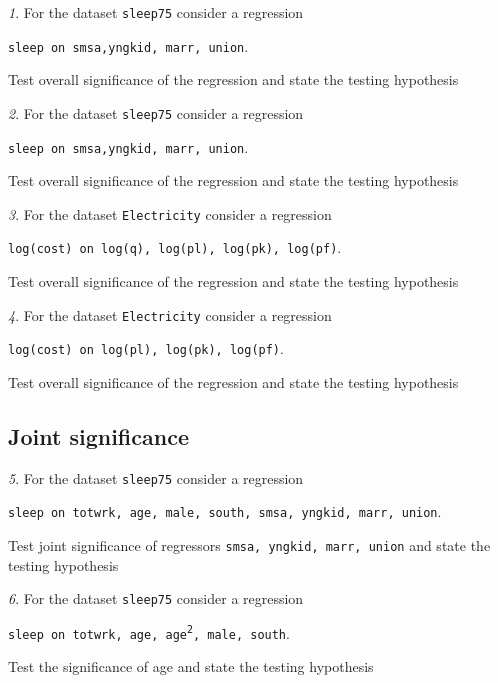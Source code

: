 \documentclass[12pt]{article}
\theoremstyle{remark}
\newtheorem{problem}{}[section]
\begin{document}
\begin{problem}
For the dataset \texttt{sleep75} consider a regression
\begin{center}
	\texttt{sleep on smsa,yngkid, marr, union}.
\end{center}
Test overall significance of the regression and state the testing hypothesis
\end{problem}

\begin{problem}
For the dataset \texttt{sleep75} consider a regression
\begin{center}
	\texttt{sleep on smsa,yngkid, marr, union}.
\end{center}
Test overall significance of the regression and state the testing hypothesis
\end{problem}

\begin{problem}
For the dataset \texttt{Electricity} consider a regression
\begin{center}
	\texttt{log(cost) on log(q), log(pl), log(pk), log(pf)}.
\end{center}
Test overall significance of the regression and state the testing hypothesis
\end{problem}

\begin{problem}
For the dataset \texttt{Electricity} consider a regression
\begin{center}
	\texttt{log(cost) on log(pl), log(pk), log(pf)}.
\end{center}
Test overall significance of the regression and state the testing hypothesis
\end{problem}

\subsection{Joint significance}

\begin{problem}
For the dataset \texttt{sleep75} consider a regression
\begin{center}
	\texttt{sleep on totwrk, age, male, south, smsa, yngkid, marr, union}.
\end{center}
Test joint significance of regressors \texttt{smsa, yngkid, marr, union} and 
state the testing hypothesis
\end{problem}

\begin{problem}
For the dataset \texttt{sleep75} consider a regression
\begin{center}
	\texttt{sleep on totwrk, age, age\textsuperscript{2}, male, south}.
\end{center}
Test the significance of age and state the testing hypothesis
\end{problem}
\end{document}
